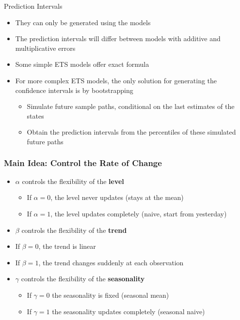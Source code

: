 \documentclass{beamer}
\begin{document}
\begin{frame}{Prediction Intervals}

  \begin{itemize}
  \item They can only be generated using the models
  \item The prediction intervals will differ between models with additive and multiplicative errors
  \item Some simple ETS models offer exact formula
  \item For more complex ETS models, the only solution for generating the confidence intervals is by bootstrapping
    \begin{itemize}
    \item Simulate future sample paths, conditional on the last estimates of the states
    \item Obtain the prediction intervals from the percentiles of these simulated future paths
    \end{itemize}
  \end{itemize}
  
\end{frame}


\begin{frame}
  \frametitle{Main Idea: Control the Rate of Change}

  \begin{itemize}
  \item $\alpha$ controls the flexibility of the \textbf{level}
    \begin{itemize}
    \item If $\alpha = 0$, the level never updates (stays at the mean)
    \item If $\alpha = 1$, the level updates completely (naive, start from yesterday)
    \end{itemize}
  \item $\beta$ controls the flexibility of the \textbf{trend}
    \item If $\beta = 0$, the trend is linear
    \item If $\beta = 1$, the trend changes suddenly at each observation
    
    \item $\gamma$ controls the flexibility of the \textbf{seasonality}
      \begin{itemize}
      \item If $\gamma = 0$ the seasonality is fixed (seasonal mean)
      \item If $\gamma = 1$ the seasonality updates completely (seasonal naive)        
      \end{itemize}
  \end{itemize}
  
\end{frame}
\end{document}
